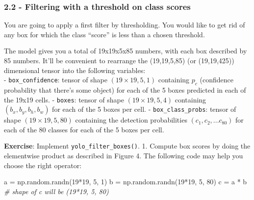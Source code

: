 \documentclass[11pt]{article}
\newenvironment{Shaded}{}{}
\newcommand{\DecValTok}[1]{\textcolor[rgb]{0.25,0.63,0.44}{{#1}}}
\newcommand{\CommentTok}[1]{\textcolor[rgb]{0.38,0.63,0.69}{\textit{{#1}}}}
\newcommand{\NormalTok}[1]{{#1}}
\newcommand{\OperatorTok}[1]{\textcolor[rgb]{0.40,0.40,0.40}{{#1}}}
\begin{document}
    \hypertarget{filtering-with-a-threshold-on-class-scores}{%
\subsubsection{2.2 - Filtering with a threshold on class
scores}\label{filtering-with-a-threshold-on-class-scores}}

You are going to apply a first filter by thresholding. You would like to
get rid of any box for which the class ``score'' is less than a chosen
threshold.

The model gives you a total of 19x19x5x85 numbers, with each box
described by 85 numbers. It'll be convenient to rearrange the
(19,19,5,85) (or (19,19,425)) dimensional tensor into the following
variables:\\
- \texttt{box\_confidence}: tensor of shape \((19 \times 19, 5, 1)\)
containing \(p_c\) (confidence probability that there's some object) for
each of the 5 boxes predicted in each of the 19x19 cells. -
\texttt{boxes}: tensor of shape \((19 \times 19, 5, 4)\) containing
\((b_x, b_y, b_h, b_w)\) for each of the 5 boxes per cell. -
\texttt{box\_class\_probs}: tensor of shape \((19 \times 19, 5, 80)\)
containing the detection probabilities \((c_1, c_2, ... c_{80})\) for
each of the 80 classes for each of the 5 boxes per cell.

\textbf{Exercise}: Implement \texttt{yolo\_filter\_boxes()}. 1. Compute
box scores by doing the elementwise product as described in Figure 4.
The following code may help you choose the right operator:

\begin{Shaded}
\begin{Highlighting}[]
\NormalTok{a }\OperatorTok{=}\NormalTok{ np.random.randn(}\DecValTok{19}\OperatorTok{*}\DecValTok{19}\NormalTok{, }\DecValTok{5}\NormalTok{, }\DecValTok{1}\NormalTok{)}
\NormalTok{b }\OperatorTok{=}\NormalTok{ np.random.randn(}\DecValTok{19}\OperatorTok{*}\DecValTok{19}\NormalTok{, }\DecValTok{5}\NormalTok{, }\DecValTok{80}\NormalTok{)}
\NormalTok{c }\OperatorTok{=}\NormalTok{ a }\OperatorTok{*}\NormalTok{ b }\CommentTok{# shape of c will be (19*19, 5, 80)}
\end{Highlighting}
\end{Shaded}
\end{document}
